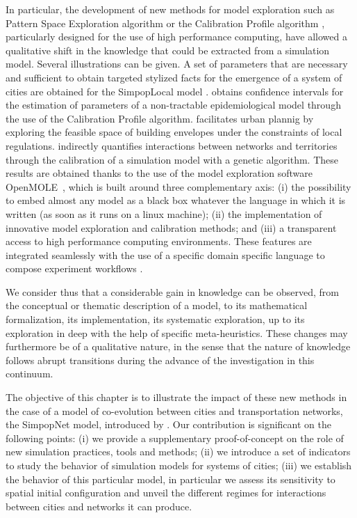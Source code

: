 In particular, the development of new methods for model exploration such as Pattern Space Exploration algorithm \cite{cherel2015beyond} or the Calibration Profile algorithm \cite{reuillon2015new}, particularly designed for the use of high performance computing, have allowed a qualitative shift in the knowledge that could be extracted from a simulation model. Several illustrations can be given. A set of parameters that are necessary and sufficient to obtain targeted stylized facts for the emergence of a system of cities are obtained for the SimpopLocal model \cite{pumain2017evaluation}. \cite{arduin2018modelisation} obtains confidence intervals for the estimation of parameters of a non-tractable epidemiological model through the use of the Calibration Profile algorithm. \cite{brasebin2017apports} facilitates urban plannig by exploring the feasible space of building envelopes under the constraints of local regulations. \cite{raimbault2018indirect} indirectly quantifies interactions between networks and territories through the calibration of a simulation model with a genetic algorithm. These results are obtained thanks to the use of the model exploration software OpenMOLE~\cite{reuillon2013openmole}, which is built around three complementary axis: (i) the possibility to embed almost any model as a black box whatever the language in which it is written (as soon as it runs on a linux machine); (ii) the implementation of innovative model exploration and calibration methods; and (iii) a transparent access to high performance computing environments. These features are integrated seamlessly with the use of a specific domain specific language to compose experiment workflows \cite{passerat2017reproducible}.



We consider thus that a considerable gain in knowledge can be observed, from the conceptual or thematic description of a model, to its mathematical formalization, its implementation, its systematic exploration, up to its exploration in deep with the help of specific meta-heuristics. These changes may furthermore be of a qualitative nature, in the sense that the nature of knowledge follows abrupt transitions during the advance of the investigation in this continuum.

The objective of this chapter is to illustrate the impact of these new methods in the case of a model of co-evolution between cities and transportation networks, the SimpopNet model, introduced by \cite{schmitt2014modelisation}. Our contribution is significant on the following points: (i) we provide a supplementary proof-of-concept on the role of new simulation practices, tools and methods; (ii) we introduce a set of indicators to study the behavior of simulation models for systems of cities; (iii) we establish the behavior of this particular model, in particular we assess its sensitivity to spatial initial configuration and unveil the different regimes for interactions between cities and networks it can produce.

